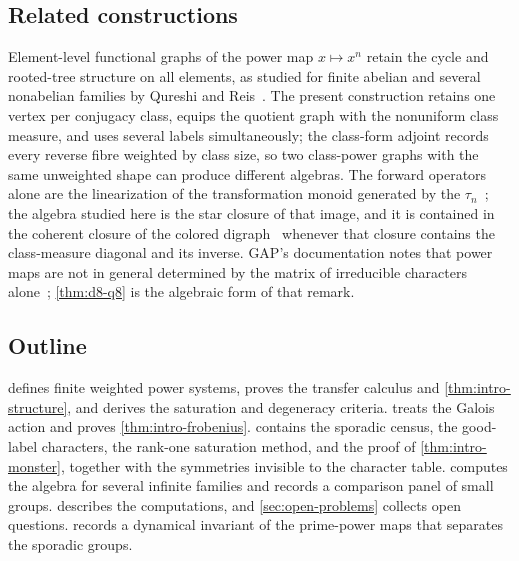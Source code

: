 \documentclass[11pt,reqno]{amsart}
\numberwithin{equation}{section}
\theoremstyle{remark}
\theoremstyle{plain}
\newcommand{\1}{\mathbf 1}
\begin{document}
\subsection{Related constructions}

Element-level functional graphs of the power map \(x\mapsto x^n\) retain
the cycle and rooted-tree structure on all elements, as studied for finite
abelian and several nonabelian families by Qureshi and
Reis~\cite{QureshiReis}.  The present construction retains one vertex per
conjugacy class, equips the quotient graph with the nonuniform class
measure, and uses several labels simultaneously; the class-form adjoint
records every reverse fibre weighted by class size, so two class-power
graphs with the same unweighted shape can produce different algebras.
The forward operators alone are the linearization of the transformation
monoid generated by the \(\tau_n\)~\cite{SteinbergTransformation,
SteinbergMonoids}; the algebra studied here is the star closure of that
image, and it is contained in the coherent closure of the colored
digraph~\cite{HigmanCoherent,HigmanCoherentAlgebras,Weisfeiler,BannaiIto,
ChenPonomarenko} whenever that closure contains the class-measure diagonal
and its inverse.  GAP's documentation notes that power maps are not in
general determined by the matrix of irreducible characters
alone~\cite{GAPPowerMaps}; \cref{thm:d8-q8} is the algebraic form of that
remark.

\subsection{Outline}

 defines finite weighted power systems, proves the
transfer calculus and \cref{thm:intro-structure}, and derives the
saturation and degeneracy criteria.   treats the
Galois action and proves \cref{thm:intro-frobenius}.  
contains the sporadic census, the good-label characters, the rank-one
saturation method, and the proof of \cref{thm:intro-monster}, together
with the symmetries invisible to the character table.
 computes the algebra for several infinite families and
records a comparison panel of small groups.  
describes the computations, and \cref{sec:open-problems} collects open
questions.   records a dynamical invariant of the
prime-power maps that separates the sporadic groups.






\end{document}
